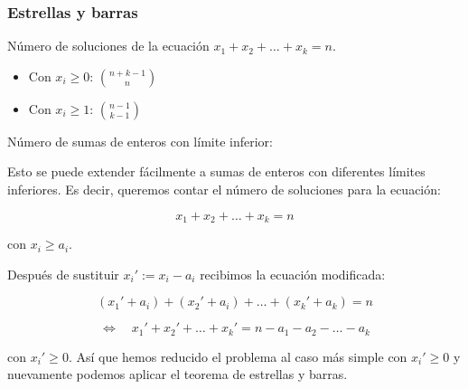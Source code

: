 \subsubsection{Estrellas y barras}

Número de soluciones de la ecuación \(x_1 + x_2 + \dots + x_k = n\).

\begin{itemize}
    \item Con \(x_i \ge 0\): \(\binom{n+k-1}{n}\)
    \item Con \(x_i \ge 1\): \(\binom{n-1}{k-1}\)
\end{itemize}

Número de sumas de enteros con límite inferior:

Esto se puede extender fácilmente a sumas de enteros con diferentes límites inferiores. Es decir, queremos contar el número de soluciones para la ecuación:

\[
x_1 + x_2 + \dots + x_k = n
\]

con \(x_i \ge a_i\).

Después de sustituir \(x_i' := x_i - a_i\) recibimos la ecuación modificada:

\[
(x_1' + a_i) + (x_2' + a_i) + \dots + (x_k' + a_k) = n
\]

\[
\Leftrightarrow \quad x_1' + x_2' + \dots + x_k' = n - a_1 - a_2 - \dots - a_k
\]

con \(x_i' \ge 0\). Así que hemos reducido el problema al caso más simple con \(x_i' \ge 0\) y nuevamente podemos aplicar el teorema de estrellas y barras.

